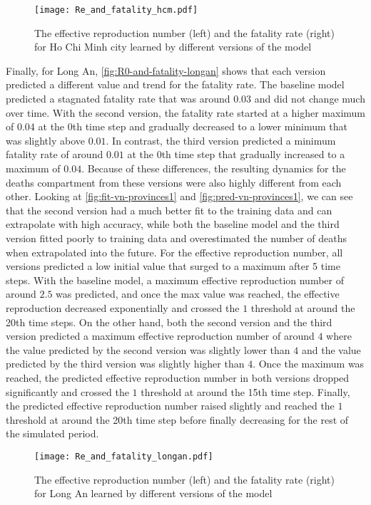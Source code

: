 \begin{figure}[!htb]
    \centering
    \texttt{[image: Re\_and\_fatality\_hcm.pdf]}
    \caption{The effective reproduction number (left) and the fatality rate (right) for Ho Chi Minh city learned by different versions of the model}
    \label{fig:R0-and-fatality-hochiminh}
\end{figure}

Finally, for Long An, \autoref{fig:R0-and-fatality-longan} shows that each version predicted a different value and trend for the fatality rate.
The baseline model predicted a stagnated fatality rate that was around $0.03$ and did not change much over time.
With the second version, the fatality rate started at a higher maximum of $0.04$ at the 0th time step and gradually decreased to a lower minimum that was slightly above $0.01$.
In contrast, the third version predicted a minimum fatality rate of around $0.01$ at the 0th time step that gradually increased to a maximum of $0.04$.
Because of these differences, the resulting dynamics for the deaths compartment from these versions were also highly different from each other.
Looking at \autoref{fig:fit-vn-provinces1} and \autoref{fig:pred-vn-provinces1}, we can see that the second version had a much better fit to the training data and can extrapolate with high accuracy, while both the baseline model and the third version fitted poorly to training data and overestimated the number of deaths when extrapolated into the future.
For the effective reproduction number, all versions predicted a low initial value that surged to a maximum after 5 time steps.
With the baseline model, a maximum effective reproduction number of around $2.5$ was predicted, and once the max value was reached, the effective reproduction decreased exponentially and crossed the $1$ threshold at around the 20th time steps.
On the other hand, both the second version and the third version predicted a maximum effective reproduction number of around $4$ where the value predicted by the second version was slightly lower than $4$ and the value predicted by the third version was slightly higher than $4$.
Once the maximum was reached, the predicted effective reproduction number in both versions dropped significantly and crossed the $1$ threshold at around the 15th time step.
Finally, the predicted effective reproduction number raised slightly and reached the $1$ threshold at around the 20th time step before finally decreasing for the rest of the simulated period.

\begin{figure}[!htb]
    \centering
    \texttt{[image: Re\_and\_fatality\_longan.pdf]}
    \caption{The effective reproduction number (left) and the fatality rate (right) for Long An learned by different versions of the model}
    \label{fig:R0-and-fatality-longan}
\end{figure}

